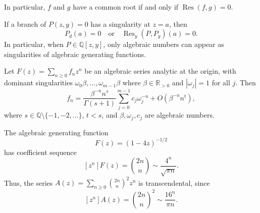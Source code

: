 In particular, \(f\) and \(g\) have a common root if and only if \(\operatorname{Res}(f, g) = 0\).

\begin{lemma}
    If a branch of \(P(z, y) = 0\) has a singularity at \(z = a\), then
    \[
        P_d(a) = 0 \quad \text{or} \quad \operatorname{Res}_y(P, P_y)(a) = 0.
    \]
    In particular, when \(P \in \mathbb{Q}[z, y]\), only algebraic numbers can appear as singularities of algebraic generating functions.
\end{lemma}

\begin{corollary}
    Let \(F(z) = \sum_{n \geq 0} f_n z^n\) be an algebraic series analytic at the origin, with dominant singularities \(\omega_0\beta, \ldots, \omega_{m-1}\beta\) where \(\beta \in \mathbb{R}_{>0}\) and \(|\omega_j| = 1\) for all \(j\). Then
    \[
        f_n = \frac{\beta^{-n} n^s}{\Gamma(s + 1)} \sum_{j = 0}^{m - 1} c_j \omega_j^{-n} + O\left(\beta^{-n} n^{t}\right),
    \]
    where \(s \in \mathbb{Q} \setminus \{-1, -2, \ldots\}\), \(t < s\), and \(\beta, \omega_j, c_j\) are algebraic numbers.
\end{corollary}

\begin{example}
    The algebraic generating function
    \[
        F(z) = (1-4z)^{-1/2}
    \]
    has coefficient sequence
    \[
        [z^n] F(z) = \binom{2n}{n} \sim \frac{4^n}{\sqrt{\pi n}}.
    \]
    Thus, the series \(A(z) = \sum_{n \geq 0} \binom{2n}{n}^2 z^n\) is transcendental, since
    \[
        [z^n] A(z) = \binom{2n}{n}^2 \sim \frac{16^n}{\pi n}.
    \]
\end{example}